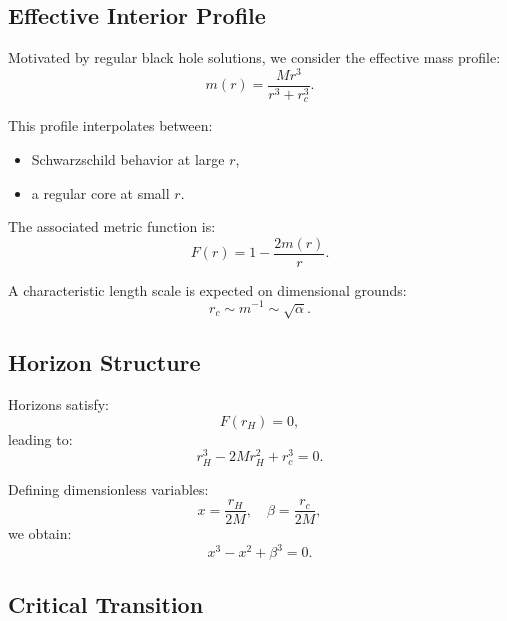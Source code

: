 \documentclass[11pt,a4paper]{article}
\begin{document}
\subsection{Effective Interior Profile}

Motivated by regular black hole solutions, we consider the effective mass profile:
\begin{equation}
m(r) = \frac{M r^3}{r^3 + r_c^3}.
\end{equation}

This profile interpolates between:
\begin{itemize}
\item Schwarzschild behavior at large $r$,
\item a regular core at small $r$.
\end{itemize}

The associated metric function is:
\begin{equation}
F(r) = 1 - \frac{2m(r)}{r}.
\end{equation}

A characteristic length scale is expected on dimensional grounds:
\begin{equation}
r_c \sim m^{-1} \sim \sqrt{\alpha}.
\end{equation}

\subsection{Horizon Structure}

Horizons satisfy:
\begin{equation}
F(r_H) = 0,
\end{equation}
leading to:
\begin{equation}
r_H^3 - 2M r_H^2 + r_c^3 = 0.
\end{equation}

Defining dimensionless variables:
\begin{equation}
x = \frac{r_H}{2M}, \quad \beta = \frac{r_c}{2M},
\end{equation}
we obtain:
\begin{equation}
x^3 - x^2 + \beta^3 = 0.
\end{equation}

\subsection{Critical Transition}
\end{document}
